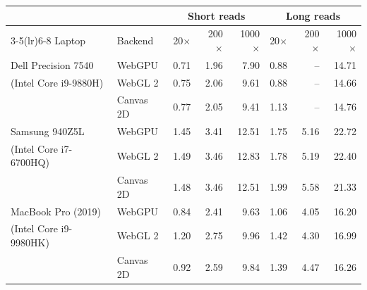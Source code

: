 \begin{tabular}{@{}llrrrrrr@{}}
\toprule
& & \multicolumn{3}{c}{Short reads} & \multicolumn{3}{c}{Long reads} \\
\cmidrule(lr){3-5}\cmidrule(lr){6-8}
Laptop & Backend & 20$\times$ & 200$\times$ & 1000$\times$ & 20$\times$ & 200$\times$ & 1000$\times$ \\
\midrule
Dell Precision 7540 & WebGPU & 0.71 & 1.96 & 7.90 & 0.88 & -- & 14.71 \\
(Intel Core i9-9880H) & WebGL 2 & 0.75 & 2.06 & 9.61 & 0.88 & -- & 14.66 \\
 & Canvas 2D & 0.77 & 2.05 & 9.41 & 1.13 & -- & 14.76 \\
\midrule
Samsung 940Z5L & WebGPU & 1.45 & 3.41 & 12.51 & 1.75 & 5.16 & 22.72 \\
(Intel Core i7-6700HQ) & WebGL 2 & 1.49 & 3.46 & 12.83 & 1.78 & 5.19 & 22.40 \\
 & Canvas 2D & 1.48 & 3.46 & 12.51 & 1.99 & 5.58 & 21.33 \\
\midrule
MacBook Pro (2019) & WebGPU & 0.84 & 2.41 & 9.63 & 1.06 & 4.05 & 16.20 \\
(Intel Core i9-9980HK) & WebGL 2 & 1.20 & 2.75 & 9.96 & 1.42 & 4.30 & 16.99 \\
 & Canvas 2D & 0.92 & 2.59 & 9.84 & 1.39 & 4.47 & 16.26 \\
\bottomrule
\end{tabular}

